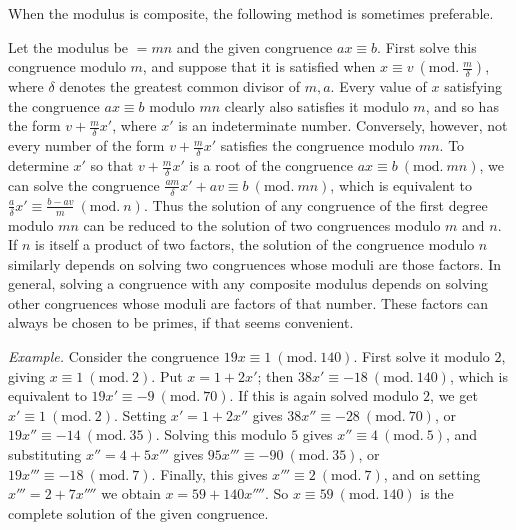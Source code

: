 
When the modulus is composite, the following method is sometimes preferable.

Let the modulus be $=mn$ and the given congruence $ax\equiv b$. First solve this congruence modulo $m$, and suppose that it is satisfied when $x\equiv v \ (\mathrm{mod.}\ \frac{m}{\delta})$, where $\delta$ denotes the greatest common divisor of $m,a$. Every value of $x$ satisfying the congruence $ax\equiv b$ modulo $mn$ clearly also satisfies it modulo $m$, and so has the form $v+\frac{m}{\delta}x'$, where $x'$ is an indeterminate number. Conversely, however, not every number of the form $v+\frac{m}{\delta}x'$ satisfies the congruence modulo $mn$. To determine $x'$ so that $v+\frac{m}{\delta}x'$ is a root of the congruence $ax\equiv b \ (\mathrm{mod.}\ mn)$, we can solve the congruence $\frac{am}{\delta}x'+av\equiv b\ (\mathrm{mod.}\ mn)$, which is equivalent to $\frac{a}{\delta}x'\equiv\frac{b-av}{m}\ (\mathrm{mod.}\ n)$. Thus the solution of any congruence of the first degree modulo $mn$ can be reduced to the solution of two congruences modulo $m$ and $n$. If $n$ is itself a product of two factors, the solution of the congruence modulo $n$ similarly depends on solving two congruences whose moduli are those factors. In general, solving a congruence with any composite modulus depends on solving other congruences whose moduli are factors of that number. These factors can always be chosen to be primes, if that seems convenient.

\emph{Example.} Consider the congruence $19x\equiv 1 \ (\mathrm{mod.}\ 140)$. First solve it modulo $2$, giving $x\equiv 1\ (\mathrm{mod.}\ 2)$. Put $x=1+2x'$; then $38x'\equiv -18\ (\mathrm{mod.}\ 140)$, which is equivalent to $19x'\equiv -9\ (\mathrm{mod.}\ 70)$. If this is
again solved modulo $2$, we get $x'\equiv 1\ (\mathrm{mod.}\ 2)$. Setting $x'=1+2x''$ gives $38x''\equiv -28\ (\mathrm{mod.}\ 70)$, or $19x''\equiv -14\ (\mathrm{mod.}\ 35)$. Solving this modulo $5$ gives $x''\equiv 4\ (\mathrm{mod.}\ 5)$, and substituting $x''=4+5x'''$ gives $95x'''\equiv -90\ (\mathrm{mod.}\ 35)$, or $19x'''\equiv -18\ (\mathrm{mod.}\ 7)$. Finally, this gives $x'''\equiv 2\ (\mathrm{mod.}\ 7)$, and on setting $x'''=2+7x''''$ we obtain $x=59+140x''''$. So $x\equiv 59\ (\mathrm{mod.}\ 140)$ is the complete solution of the given congruence.


